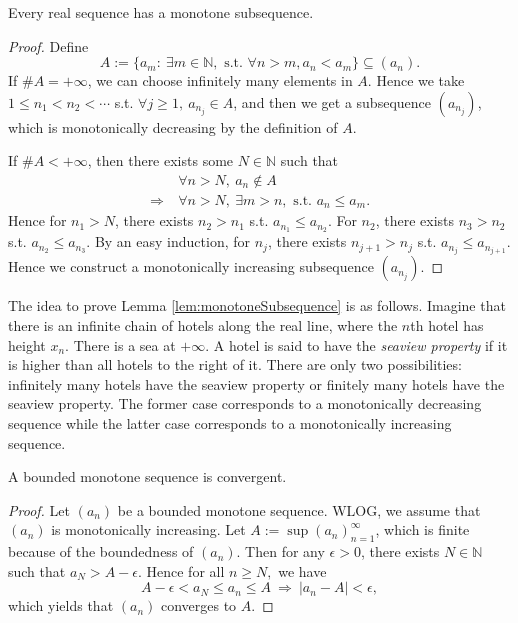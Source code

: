\begin{lem}
  \label{lem:monotoneSubsequence}
  Every real sequence has a monotone subsequence.
\end{lem}
\begin{proof}
  Define
  \begin{displaymath}
    A:=\{a_{m}:\ \exists m\in \mathbb{N},\text{ s.t. }
  \forall n>m, a_{n}<a_{m}\}\subseteq (a_{n}).
  \end{displaymath}
  If $\#A=+\infty$, we can choose infinitely many elements in $A$.
  Hence we take $1\le n_{1}<n_{2}<\cdots$ s.t.
  $\forall j\ge 1,\ a_{n_{j}}\in A$, 
  and then we get a subsequence $(a_{n_{j}})$,
  which is monotonically decreasing by the definition of $A$.

  If $\#A<+\infty$, then there exists some $N\in \mathbb{N}$ such that
  \begin{align*}
    &\forall n>N,\ a_{n}\notin A\\
    \Rightarrow\ &\forall n>N,\ \exists m>n,\text{ s.t. } a_{n}\le a_{m}.
  \end{align*}
  Hence for $n_{1}>N$, there exists $n_{2}>n_{1}$ s.t.
  $a_{n_{1}}\le a_{n_{2}}$. For $n_{2}$, there exists $n_{3}>n_{2}$ s.t.
  $a_{n_{2}}\le a_{n_{3}}$. By an easy induction, for $n_{j}$,
  there exists $n_{j+1}>n_{j}$ s.t. $a_{n_{j}}\le a_{n_{j+1}}$.
  Hence we construct a monotonically increasing subsequence
  $(a_{n_{j}})$.
\end{proof}

\begin{rem}
  The idea to prove Lemma \ref{lem:monotoneSubsequence} is as follows.
  Imagine that there is an infinite chain of hotels
  along the real line,
  where the $n$th hotel has height $x_n$.
  There is a sea at $+\infty$.
  A hotel is said to have the \emph{seaview property}
  if it is higher than all hotels to the right of it.
  There are only two possibilities:
  infinitely many hotels have the seaview property
  or finitely many hotels have the seaview property.
  The former case corresponds to a monotonically decreasing sequence
  while
  the latter case corresponds to a monotonically increasing sequence.
\end{rem}

\begin{thm}
  \label{thm:boundedMonotoneSeqIsConvergent}
  A bounded monotone sequence is convergent.
\end{thm}
\begin{proof}
  Let $(a_{n})$ be a bounded monotone sequence.
  WLOG, we assume that $(a_{n})$ is monotonically increasing.
  Let $A:=\sup(a_{n})_{n=1}^{\infty}$, which is finite because of
  the boundedness of $(a_{n})$.
  Then for any $\epsilon>0$, there exists $N\in \mathbb{N}$ such that
  $a_{N}>A-\epsilon$. Hence for all $n\ge N,$ we have
  \begin{displaymath}
    A-\epsilon<a_{N}\le a_{n}\le A\ \Rightarrow\ |a_{n}-A|<\epsilon,
  \end{displaymath}
  which yields that $(a_{n})$ converges to $A$.
\end{proof}

